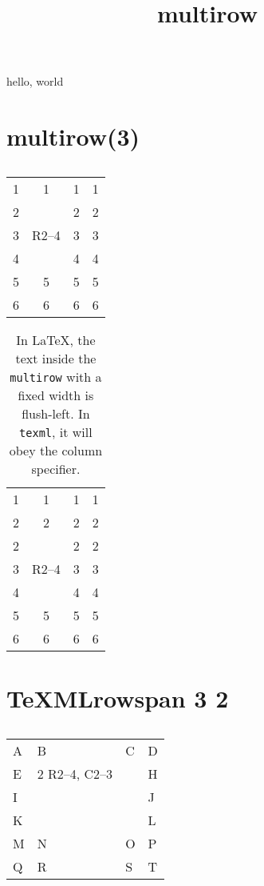 \documentclass{amsart}
\title{multirow}
\begin{document}
\maketitle

hello, world

\section*{multirow(3)}

\begin{table}[h]
\caption{}

\begin{tabular}{cccc}
1 & 1                  & 1 & 1\\
2 & \multirow{3}{*}{R2--4} & 2 & 2\\
3 &                    & 3 & 3\\
4 &                    & 4 & 4\\
5 & 5                  & 5 & 5\\
6 & 6                  & 6 & 6
\end{tabular}

\end{table}

\begin{table}[h]
\caption{In \LaTeX, the text inside the \texttt{multirow} with a fixed
  width is flush-left.  In \texttt{texml}, it will obey the column
  specifier.}

\begin{tabular}{cccc}
1 & 1                  & 1 & 1\\
2 & 2           & 2 & 2\\
2 & \multirow{3}{8em}{R2--4} & 2 & 2\\
3 &                    & 3 & 3\\
4 &                    & 4 & 4\\
5 & 5                  & 5 & 5\\
6 & 6                  & 6 & 6
\end{tabular}

\end{table}

\ifx\TeXMLrowspan\undefined\else

\section*{TeXMLrowspan 3 2}

\begin{table}[h]
\caption{}
\begin{tabular}{llll}
A &   B & C                & D\\
E &   \TeXMLrowspan 3 2 R2--4, C2--3 & & H\\
I &                        & & J \\
K &                        & & L \\
M &   N & O                & P\\
Q &   R & S                & T
\end{tabular}
\end{table}
\fi
\end{document}
